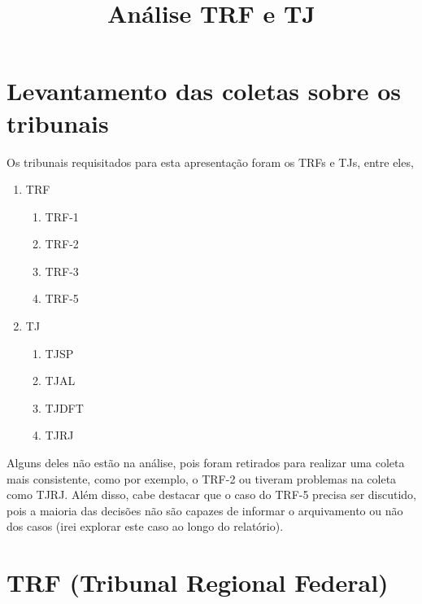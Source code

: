 \documentclass[12pt]{article}
\title{Análise TRF e TJ}
\author{}
\begin{document}
\maketitle

\thispagestyle{fancy}

{
\hypersetup{linkcolor=black}
\setcounter{tocdepth}{2}
\tableofcontents
}
\pagebreak

\section{Levantamento das coletas sobre os
tribunais}\label{levantamento-das-coletas-sobre-os-tribunais}

Os tribunais requisitados para esta apresentação foram os TRFs e TJs,
entre eles,

\begin{enumerate}
\def\labelenumi{\arabic{enumi}.}
\item
  TRF

  \begin{enumerate}
  \def\labelenumii{\alph{enumii})}
  \item
    TRF-1
  \item
    TRF-2
  \item
    TRF-3
  \item
    TRF-5
  \end{enumerate}
\item
  TJ

  \begin{enumerate}
  \def\labelenumii{\alph{enumii})}
  \item
    TJSP
  \item
    TJAL
  \item
    TJDFT
  \item
    TJRJ
  \end{enumerate}
\end{enumerate}

Alguns deles não estão na análise, pois foram retirados para realizar
uma coleta mais consistente, como por exemplo, o TRF-2 ou tiveram
problemas na coleta como TJRJ. Além disso, cabe destacar que o caso do
TRF-5 precisa ser discutido, pois a maioria das decisões não são capazes
de informar o arquivamento ou não dos casos (irei explorar este caso ao
longo do relatório).

\section{TRF (Tribunal Regional
Federal)}\label{trf-tribunal-regional-federal}
\end{document}
